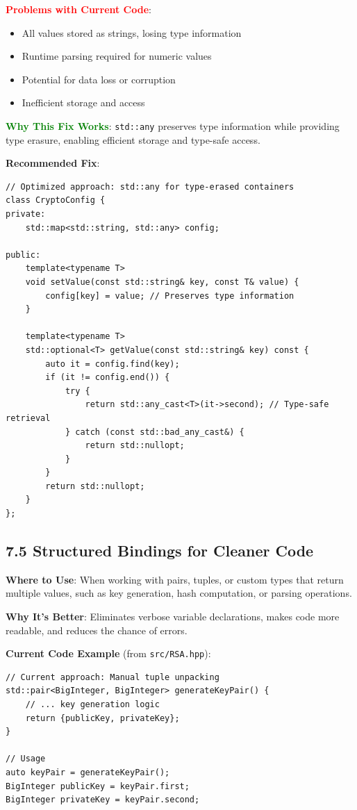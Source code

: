 \documentclass[11pt,a4paper]{article}
\begin{document}
\textcolor{red}{\textbf{Problems with Current Code}}:
\begin{itemize}
    \item All values stored as strings, losing type information
    \item Runtime parsing required for numeric values
    \item Potential for data loss or corruption
    \item Inefficient storage and access
\end{itemize}

\textcolor{green}{\textbf{Why This Fix Works}}: \texttt{std::any} preserves type information while providing type erasure, enabling efficient storage and type-safe access.

\textbf{Recommended Fix}:
\begin{lstlisting}
// Optimized approach: std::any for type-erased containers
class CryptoConfig {
private:
    std::map<std::string, std::any> config;
    
public:
    template<typename T>
    void setValue(const std::string& key, const T& value) {
        config[key] = value; // Preserves type information
    }
    
    template<typename T>
    std::optional<T> getValue(const std::string& key) const {
        auto it = config.find(key);
        if (it != config.end()) {
            try {
                return std::any_cast<T>(it->second); // Type-safe retrieval
            } catch (const std::bad_any_cast&) {
                return std::nullopt;
            }
        }
        return std::nullopt;
    }
};
\end{lstlisting}

\subsection{7.5 Structured Bindings for Cleaner Code}

\textbf{Where to Use}: When working with pairs, tuples, or custom types that return multiple values, such as key generation, hash computation, or parsing operations.

\textbf{Why It's Better}: Eliminates verbose variable declarations, makes code more readable, and reduces the chance of errors.

\textbf{Current Code Example} (from \texttt{src/RSA.hpp}):
\begin{lstlisting}
// Current approach: Manual tuple unpacking
std::pair<BigInteger, BigInteger> generateKeyPair() {
    // ... key generation logic
    return {publicKey, privateKey};
}

// Usage
auto keyPair = generateKeyPair();
BigInteger publicKey = keyPair.first;
BigInteger privateKey = keyPair.second;
\end{lstlisting}
\end{document}

